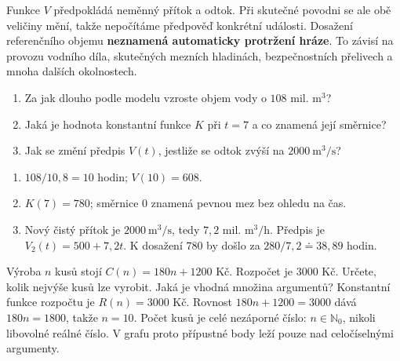 \documentclass[11pt,a4paper]{article}
\begin{document}
Funkce $V$ předpokládá neměnný přítok a odtok. Při skutečné povodni se ale obě
veličiny mění, takže nepočítáme předpověď konkrétní události. Dosažení
referenčního objemu \textbf{neznamená automaticky protržení hráze}.
To závisí na provozu vodního díla, skutečných mezních hladinách,
bezpečnostních přelivech a mnoha dalších okolnostech.

\begin{zadaniReseniBox}[title={Samostatná práce 1}]
\begin{enumerate}[label=\alph*)]
\item Za jak dlouho podle modelu vzroste objem vody o $108$ mil. $\mathrm{m}^3$?
\item Jaká je hodnota konstantní funkce $K$ při $t=7$ a co znamená její směrnice?
\item Jak se změní předpis $V(t)$, jestliže se odtok zvýší na $2000\ \mathrm{m}^3/\mathrm{s}$?
\end{enumerate}
\tcblower
\begin{enumerate}[label=\alph*)]
\item $108/10{,}8=10$ hodin; $V(10)=608$.
\item $K(7)=780$; směrnice $0$ znamená pevnou mez bez ohledu na čas.
\item Nový čistý přítok je $2000\ \mathrm{m}^3/\mathrm{s}$,
tedy $7{,}2$ mil. $\mathrm{m}^3/\mathrm{h}$. Předpis je
$V_2(t)=500+7{,}2t$. K dosažení $780$ by došlo za
$280/7{,}2\doteq38{,}89$ hodin.
\end{enumerate}
\end{zadaniReseniBox}

\begin{zadaniReseniBox}[title={Rozšíření 1}]
Výroba $n$ kusů stojí $C(n)=180n+1200$ Kč. Rozpočet je $3000$ Kč.
Určete, kolik nejvýše kusů lze vyrobit. Jaká je vhodná množina argumentů?
\tcblower
Konstantní funkce rozpočtu je $R(n)=3000$ Kč.
Rovnost $180n+1200=3000$ dává $180n=1800$, takže $n=10$.
Počet kusů je celé nezáporné číslo: $n\in\mathbb N_0$, nikoli libovolné
reálné číslo. V grafu proto přípustné body leží pouze nad celočíselnými argumenty.
\end{zadaniReseniBox}
\end{document}
